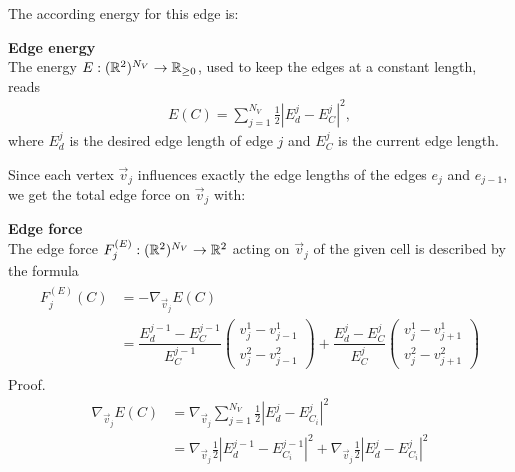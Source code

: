 The according energy for this edge is:
\begin{definition} \textbf{Edge energy} \\
	The energy $E: (\mathbb{R}^2)^{N_V} \rightarrow \mathbb{R}_{\geq 0}$, used to keep the edges at a constant length, reads 
	\begin{align}
		E(C) =  \sum\limits_{j=1}^{N_V} \frac{1}{2} | E^{j}_d - E^j_{C}|^2, \label{eq:edgeEnergy} 
	\end{align}
	where $E^{j}_d$ is the desired edge length of edge $j$ and $E^j_{C}$ is the current edge length. 
\end{definition}

Since each vertex $\vec{v}_j$ influences exactly the edge lengths of the edges $e_{j}$ and $e_{j-1}$, we get the total edge force on $\vec{v}_j$ with: 

\begin{proposition} \textbf{Edge force} \\

	The edge force $F^{(E)}_j: (\mathbb{R}^2)^{N_V} \rightarrow \mathbb{R}^2$ acting on $\vec{v}_j$ of the given cell is described by the formula
	\begin{align}
		\begin{split}
			F^{(E)}_j(C) &= - \nabla_{\vec{v}_j} E(C) \\
				&= \dfrac{E_d^{j-1} - E^{j-1}_{C}}{E^{j-1}_{C}}  \begin{pmatrix} v_{j}^{1} - v_{j-1}^{1} \\[0.5em]  v_{j}^{2} - v_{j-1}^{2}  \end{pmatrix}
				+ \dfrac{E_d^{j} - E^j_{C}}{E^j_{C}}  \begin{pmatrix} v_{j}^{1} - v_{j+1}^{1} \\[0.5em]  v_{j}^{2} - v_{j+1}^{2} 
			\end{pmatrix}
		\end{split}
		\label{force:edge}
	\end{align}
	Proof. \\

	\begin{align*}
		\nabla_{\vec{v}_{j}} E(C) &= \nabla_{\vec{v}_{j}} \sum\limits_{j=1}^{N_V} \frac{1}{2} | E^{j}_d - E^j_{C_i}|^2 \\
		&= \nabla_{\vec{v}_{j}} \frac{1}{2} | E^{j-1}_d - E^{j-1}_{C_i}|^2 + \nabla_{\vec{v}_{j}} \frac{1}{2} | E^{j}_d - E^j_{C_i}|^2 
	\end{align*}


\end{proposition}
